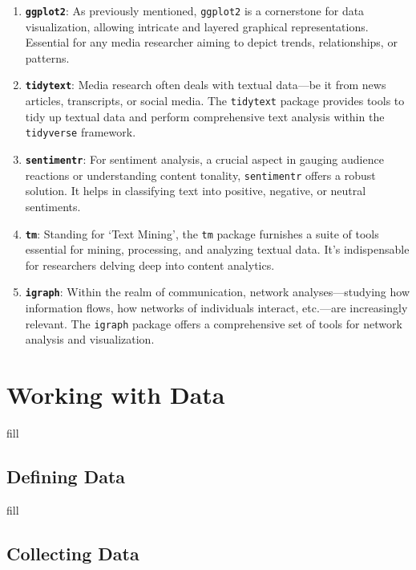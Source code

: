 \documentclass[
  b5paper]{book}
\begin{document}
\begin{enumerate}
\def\labelenumi{\arabic{enumi}.}
\item
  \textbf{\texttt{ggplot2}}: As previously mentioned, \texttt{ggplot2} is a cornerstone for data visualization, allowing intricate and layered graphical representations. Essential for any media researcher aiming to depict trends, relationships, or patterns.
\item
  \textbf{\texttt{tidytext}}: Media research often deals with textual data---be it from news articles, transcripts, or social media. The \texttt{tidytext} package provides tools to tidy up textual data and perform comprehensive text analysis within the \texttt{tidyverse} framework.
\item
  \textbf{\texttt{sentimentr}}: For sentiment analysis, a crucial aspect in gauging audience reactions or understanding content tonality, \texttt{sentimentr} offers a robust solution. It helps in classifying text into positive, negative, or neutral sentiments.
\item
  \textbf{\texttt{tm}}: Standing for `Text Mining', the \texttt{tm} package furnishes a suite of tools essential for mining, processing, and analyzing textual data. It's indispensable for researchers delving deep into content analytics.
\item
  \textbf{\texttt{igraph}}: Within the realm of communication, network analyses---studying how information flows, how networks of individuals interact, etc.---are increasingly relevant. The \texttt{igraph} package offers a comprehensive set of tools for network analysis and visualization.
\end{enumerate}

\hypertarget{working-with-data-1}{%
\chapter{Working with Data}\label{working-with-data-1}}

fill

\hypertarget{defining-data}{%
\section{Defining Data}\label{defining-data}}

fill

\hypertarget{collecting-data}{%
\section{Collecting Data}\label{collecting-data}}
\end{document}
